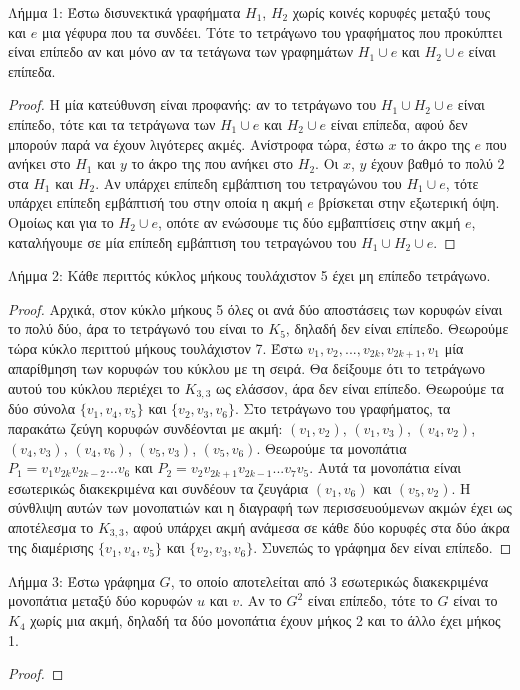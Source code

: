 \documentclass[a4paper, oneside, 11pt]{article}
\theoremstyle{definition}
\begin{document}
\begin{enumerate}
Λήμμα 1: Έστω δισυνεκτικά γραφήματα $H_1$, $H_2$ χωρίς κοινές κορυφές μεταξύ τους και $e$ μια γέφυρα που τα συνδέει. Τότε το τετράγωνο του γραφήματος που προκύπτει είναι επίπεδο αν και
μόνο αν τα τετάγωνα των γραφημάτων $H_1 \cup e$ και $H_2 \cup e$ είναι επίπεδα.
	\begin{proof}
Η μία κατεύθυνση είναι προφανής: αν το τετράγωνο του $H_1\cup H_2\cup e$ είναι επίπεδο, τότε και τα τετράγωνα των $H_1\cup e$ και $H_2\cup e$ είναι επίπεδα, αφού δεν μπορούν παρά να έχουν λιγότερες ακμές.
Ανίστροφα τώρα, έστω $x$ το άκρο της $e$ που ανήκει στο $H_1$ και $y$ το άκρο της που ανήκει στο $H_2$. Οι $x$, $y$ έχουν βαθμό το πολύ 2 στα $H_1$ και $H_2$. 
Αν υπάρχει επίπεδη εμβάπτιση του τετραγώνου του $H_1\cup e$, τότε υπάρχει επίπεδη εμβάπτισή του στην οποία η ακμή $e$ βρίσκεται στην εξωτερική όψη. 
Ομοίως και για το $H_2\cup e$, οπότε αν ενώσουμε τις δύο εμβαπτίσεις στην ακμή $e$, καταλήγουμε σε μία επίπεδη εμβάπτιση του τετραγώνου του $H_1\cup H_2\cup e$.
	\end{proof}
Λήμμα 2: Κάθε περιττός κύκλος μήκους τουλάχιστον 5 έχει μη επίπεδο τετράγωνο.
	\begin{proof}
Αρχικά, στον κύκλο μήκους 5 όλες οι ανά δύο αποστάσεις των κορυφών είναι το πολύ δύο, άρα το τετράγωνό του είναι το $K_5$, δηλαδή δεν είναι επίπεδο. Θεωρούμε τώρα κύκλο περιττού μήκους τουλάχιστον 7.
Έστω $v_1, v_2, ..., v_{2k}, v_{2k+1}, v_1$ μία απαρίθμηση των κορυφών του κύκλου με τη σειρά. Θα δείξουμε ότι το τετράγωνο αυτού του κύκλου περιέχει το $K_{3,3}$ ως ελάσσον,
άρα δεν είναι επίπεδο. Θεωρούμε τα δύο σύνολα $\{v_1,v_4,v_5\}$ και $\{v_2,v_3,v_6\}$. Στο τετράγωνο του γραφήματος, τα παρακάτω ζεύγη κορυφών συνδέονται με ακμή: $(v_1, v_2)$, $(v_1,v_3)$, $(v_4,v_2)$,
$(v_4,v_3)$, $(v_4,v_6)$, $(v_5,v_3)$, $(v_5,v_6)$. Θεωρούμε τα μονοπάτια $P_1=v_1 v_{2k} v_{2k-2} ... v_6$ και $P_2=v_2 v_{2k+1} v_{2k-1} ... v_7 v_5$. Αυτά τα μονοπάτια είναι εσωτερικώς διακεκριμένα και 
συνδέουν τα ζευγάρια $(v_1,v_6)$ και $(v_5,v_2)$. Η σύνθλιψη αυτών των μονοπατιών και η διαγραφή των περισσευούμενων ακμών έχει ως αποτέλεσμα το $K_{3,3}$, αφού υπάρχει ακμή ανάμεσα σε κάθε δύο κορυφές
στα δύο άκρα της διαμέρισης $\{v_1,v_4,v_5\}$ και $\{v_2,v_3,v_6\}$. Συνεπώς το γράφημα δεν είναι επίπεδο.
	\end{proof}
Λήμμα 3: Έστω γράφημα $G$, το οποίο αποτελείται από 3 εσωτερικώς διακεκριμένα μονοπάτια μεταξύ δύο κορυφών $u$ και $v$. Αν το $G^2$ είναι επίπεδο, τότε το $G$ είναι το $K_4$ χωρίς μια ακμή, δηλαδή τα 
δύο μονοπάτια έχουν μήκος 2 και το άλλο έχει μήκος 1.
	\begin{proof}

\end{proof}
\end{enumerate}
\end{document}
